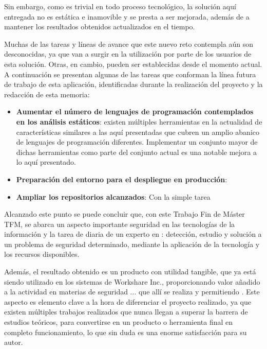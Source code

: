Sin embargo, como es trivial en todo proceso tecnológico, la solución aquí entregada no es estática e inamovible y se presta a ser mejorada, además de a mantener los resultados obtenidos actualizados en el tiempo.

Muchas de las tareas y líneas de avance que este nuevo reto contempla aún son desconocidas, ya que van a surgir en la utilización por parte de los usuarios de esta solución. Otras, en cambio, pueden ser establecidas desde el momento actual. A continuación se presentan algunas de las tareas que conforman la línea futura de trabajo de esta aplicación, identificadas durante la realización del proyecto y la redacción de esta memoria:

\begin{itemize}
	\item \textbf{Aumentar el número de lenguajes de programación contemplados en los análisis estáticos}: existen múltiples herramientas en la actualidad de características similares a las aquí presentadas que cubren un amplio abanico de lenguajes de programación diferentes. Implementar un conjunto mayor de dichas herramientas como parte del conjunto actual es una notable mejora a lo aquí presentado.
	\item \textbf{Preparación del entorno para el despliegue en producción}: 
	\item \textbf{Ampliar los repositorios alcanzados}: Con la simple tarea 
\end{itemize}

Alcanzado este punto se puede concluir que, con este Trabajo Fin de Máster \gls{TFM}, se abarca un aspecto importante  seguridad en las tecnologías de la información y la tarea de diaria de un experto en : detección, estudio y solución a un problema de seguridad determinado, mediante la aplicación de la tecnología y los recursos disponibles.

Además, el resultado obtenido es un producto con utilidad tangible, que ya está siendo utilizado en los sistemas de Workshare Inc., proporcionando valor añadido a la actividad en materias de seguridad ... que allí se realiza y permitiendo . Este aspecto es elemento clave a la hora de diferenciar el proyecto realizado, ya que existen múltiples trabajos realizados que nunca llegan a superar la barrera de estudios teóricos, para convertirse en un producto o herramienta final en completo funcionamiento, lo que sin duda es una enorme satisfacción para su autor.

\endinput
